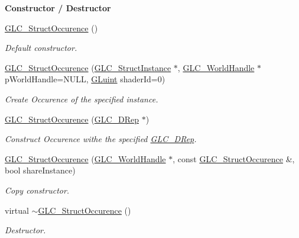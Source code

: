 \begin{Indent}{\bf Constructor / Destructor}\par
\begin{DoxyCompactItemize}
\item 
\hyperlink{class_g_l_c___struct_occurence_a1087e296fd658cf3bdc8f6a909c4f22c}{G\-L\-C\-\_\-\-Struct\-Occurence} ()
\begin{DoxyCompactList}\small\item\em Default constructor. \end{DoxyCompactList}\item 
\hyperlink{class_g_l_c___struct_occurence_a599d9567700a80ab9239e752372ae0d6}{G\-L\-C\-\_\-\-Struct\-Occurence} (\hyperlink{class_g_l_c___struct_instance}{G\-L\-C\-\_\-\-Struct\-Instance} $\ast$, \hyperlink{class_g_l_c___world_handle}{G\-L\-C\-\_\-\-World\-Handle} $\ast$p\-World\-Handle=N\-U\-L\-L, \hyperlink{glext_8h_a2f0c8cd5c21f9fcbd931c3f48bc90dfc}{G\-Luint} shader\-Id=0)
\begin{DoxyCompactList}\small\item\em Create Occurence of the specified instance. \end{DoxyCompactList}\item 
\hyperlink{class_g_l_c___struct_occurence_a6988917cdb75659d77c635aef2196d2f}{G\-L\-C\-\_\-\-Struct\-Occurence} (\hyperlink{class_g_l_c__3_d_rep}{G\-L\-C\-\_\-D\-Rep} $\ast$)
\begin{DoxyCompactList}\small\item\em Construct Occurence withe the specified \hyperlink{class_g_l_c__3_d_rep}{G\-L\-C\-\_\-D\-Rep}. \end{DoxyCompactList}\item 
\hyperlink{class_g_l_c___struct_occurence_ae476a4c820e03cd8e0533e95a5ca8f3a}{G\-L\-C\-\_\-\-Struct\-Occurence} (\hyperlink{class_g_l_c___world_handle}{G\-L\-C\-\_\-\-World\-Handle} $\ast$, const \hyperlink{class_g_l_c___struct_occurence}{G\-L\-C\-\_\-\-Struct\-Occurence} \&, bool share\-Instance)
\begin{DoxyCompactList}\small\item\em Copy constructor. \end{DoxyCompactList}\item 
virtual \hyperlink{class_g_l_c___struct_occurence_a540d36c742a8c7cd6b063ca1a1c82b18}{$\sim$\-G\-L\-C\-\_\-\-Struct\-Occurence} ()
\begin{DoxyCompactList}\small\item\em Destructor. \end{DoxyCompactList}\end{DoxyCompactItemize}
\end{Indent}
